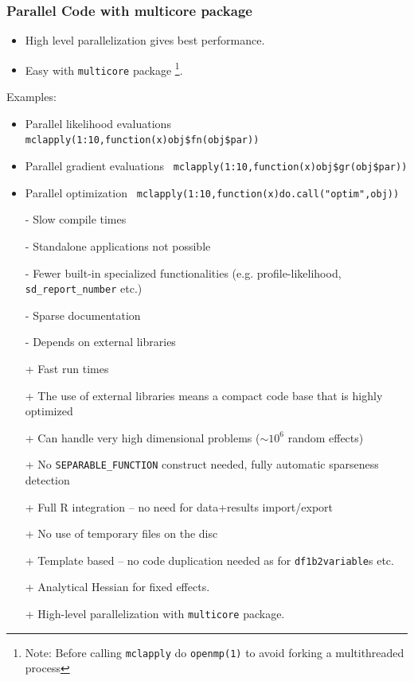 \documentclass[compress]{beamer}
\begin{document}
\begin{frame}
  \frametitle{Parallel Code with multicore package}
  \begin{itemize}
  \item High level parallelization gives best performance.
  \item Easy with \texttt{multicore} package \footnote{Note: Before
      calling \texttt{mclapply} do \texttt{openmp(1)} to avoid forking a
      multithreaded process}.
  \end{itemize}
  Examples:
  \begin{itemize}
  \item Parallel likelihood evaluations \texttt{
      mclapply(1:10,function(x)obj\$fn(obj\$par))}
  \item Parallel gradient evaluations \texttt{
      mclapply(1:10,function(x)obj\$gr(obj\$par))}
  \item Parallel optimization \texttt{
      mclapply(1:10,function(x)do.call("optim",obj))}
  \end{itemize}
\end{frame}


\begin{frame}
  \begin{itemize}
    \item[-] Slow compile times
    \item[-] Standalone applications not possible
    \item[-] Fewer built-in specialized functionalities (e.g. profile-likelihood, \texttt{sd\_report\_number} etc.)
    \item[-] Sparse documentation
    \item[-] Depends on external libraries
  \end{itemize}
\end{frame}

\begin{frame}
  \begin{itemize}
    \item[+] Fast run times
    \item[+] The use of external libraries means a compact code base that is highly optimized
    \item[+] Can handle very high dimensional problems ($\sim 10^6$ random effects)
    \item[+] No \texttt{SEPARABLE\_FUNCTION} construct needed, fully automatic sparseness detection
    \item[+] Full R integration -- no need for data+results import/export
    \item[+] No use of temporary files on the disc
    \item[+] Template based -- no code duplication needed as for \texttt{df1b2variable}s etc.
    \item[+] Analytical Hessian for fixed effects.
    \item[+] High-level parallelization with \texttt{multicore} package. 
  \end{itemize}
\end{frame}
\end{document}
